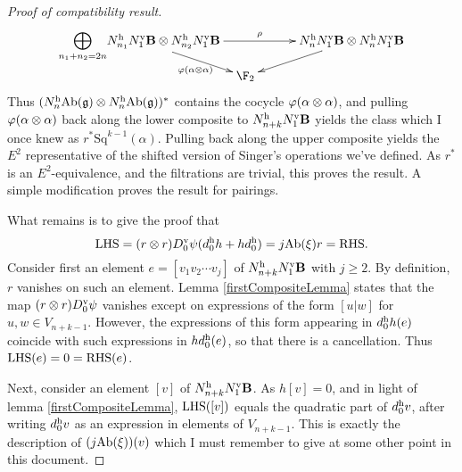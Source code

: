 \documentclass[10pt]{article}
\newcommand{\Sq}{\mathrm{Sq}}
\begin{document}
\begin{Lie Steenrods satisfy the Adem relation}
\begin{proof}[Proof of compatibility result]
\[\xymatrix@R=10mm@C=30mm@!0{
\smash{\displaystyle\bigoplus_{n_1+n_2=2n}}
N^\textup{h}_{n_1}N^\textup{v}_1\textbf{B}\otimes N^\textup{h}_{n_2}N^\textup{v}_1\textbf{B}\ar[rr]^-{\rho}
\ar[dr]_-{\oldphi(\alpha\otimes\alpha)}
&%
&%
N^\textup{h}_{n}N^\textup{v}_1\textbf{B}\otimes N^\textup{h}_{n}N^\textup{v}_1\textbf{B}
\ar[dl]
\\%
&%
\F_2&%
}\]
Thus $(N^\textup{h}_n\textup{Ab}(\frakg)\otimes N^\textup{h}_n\textup{Ab}(\frakg))^*$ contains the cocycle $\oldphi(\alpha\otimes\alpha)$, and pulling $\oldphi(\alpha\otimes\alpha)$ back along the lower composite to $N_{n+k}^\textup{h}N_1^\textup{v}\textbf{B}$ yields the class which I once knew as $r^*\Sq^{k-1}(\alpha)$. Pulling back along the upper composite yields the $E^2$ representative of the shifted version of Singer's operations we've defined. As $r^*$ is an $E^2$-equivalence, and the filtrations are trivial, this proves the result. A simple modification proves the result for pairings.


What remains is to give the proof that 
\[\textup{LHS}=(r\otimes r)\circ D^\textup{v}_0\circ\psi\circ(d_0^\textup{h}h+hd^\textup{h}_0)= j\circ\textup{Ab}(\xi)\circ r=\textup{RHS}.\]
Consider first an element $e=[v_1v_2\cdots v_j]$ of $N_{n+k}^\textup{h}N_1^\textup{v}\textbf{B}$ with $j\geq2$. By definition, $r$ vanishes on such an element. Lemma \ref{firstCompositeLemma} states that the map $(r\otimes r)\circ D^\textup{v}_0\circ\psi$ vanishes except on expressions of the form $[u|w]$ for $u,w\in V_{n+k-1}$. However, the expressions of this form appearing in $d^\textup{h}_0h(e)$ coincide with such expressions in $hd^\textup{h}_0(e)$, so that there is a cancellation. Thus $\textup{LHS}(e)=0=\textup{RHS}(e)$.

Next, consider an element $[v]$ of $N_{n+k}^\textup{h}N_1^\textup{v}\textbf{B}$. As $h[v]=0$, and in light of lemma \ref{firstCompositeLemma}, $\textup{LHS}([v])$ equals the quadratic part of $d_0^\textup{h}v$, after writing $d_0^\textup{h}v$ as an expression in elements of $V_{n+k-1}$. This is exactly the description of $(j\circ\textup{Ab}(\xi))(v)$ which I must remember to give at some other point in this document.
\end{proof}















\end{Lie Steenrods satisfy the Adem relation}
\end{document}
